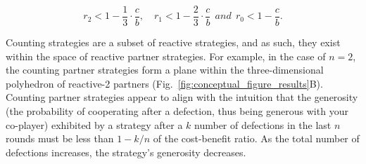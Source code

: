 \documentclass{article}
\theoremstyle{definition}
\begin{document}
\begin{equation}\label{eq:counting_three_bit_conditions}
  \displaystyle r_2 < 1- \frac{1}{3} \cdot \frac{c}{b}, \quad r_1 < 1- \frac{2}{3} \cdot \frac{c}{b} ~~and~~ r_0 < 1\!-\! \frac{c}{b}.
\end{equation}

Counting strategies are a subset of reactive strategies, and as such, they exist
within the space of reactive partner strategies. For example, in the case of
$n=2$, the counting partner strategies form a plane within the three-dimensional
polyhedron of reactive-2 partners (Fig.~\ref{fig:conceptual_figure_results}B).
Counting partner strategies appear to align with the intuition that the
generosity (the probability of cooperating after a defection, thus being
generous with your co-player) exhibited by a strategy after a $k$ number of
defections in the last $n$ rounds must be less than $1 - k/n$ of the
cost-benefit ratio. As the total number of defections increases, the strategy's
generosity decreases.
\end{document}
